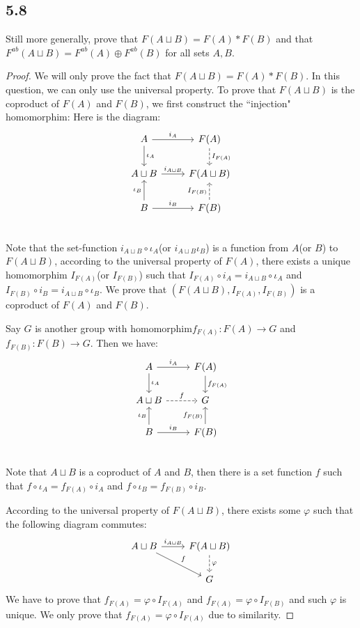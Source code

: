 \documentclass[a4paper, pdf, 12pt]{article}
\begin{document}
\subsection*{5.8}
Still more generally, prove that $F(A\sqcup B) = F(A)*F(B)$ and that $F^{ab}(A\sqcup B) =
F^{ab}(A) \oplus F^{ab}(B)$ for all sets $A, B$. 
\begin{proof}
  We will only prove the fact that $F(A\sqcup B) = F(A) * F(B)$. In this question, we can only use the universal property.
  To prove that $F(A\sqcup B)$ is the coproduct of $F(A)$ and $F(B)$, we first construct the ``injection" homomorphim:
  Here is the diagram:
  $$
  \begin{tikzcd}
    A \ar[r, "i_{A}"] \ar[d, "\iota_{A}"] & F(A) \ar[d, dashed, "I_{F(A)}"]\\
    A\sqcup B \ar[r, "i_{A\sqcup B}"] & F(A\sqcup B) \\
    B \ar[r, "i_{B}"] \ar[u, "\iota_{B}"] & F(B) \ar[u, dashed, "I_{F(B)}"]\\
  \end{tikzcd}
  $$
  Note that the set-function $i_{A\sqcup B}\circ\iota_{A}$(or $i_{A\sqcup B}\iota_{B}$) is a function from $A$(or $B$) to $F(A\sqcup B)$, 
  according to the universal property of $F(A)$, there exists a unique homomorphim $I_{F(A)}$(or $I_{F(B)}$) such that 
  $I_{F(A)}\circ i_{A} = i_{A\sqcup B}\circ \iota_{A}$ and $I_{F(B)}\circ i_{B} = i_{A\sqcup B}\circ \iota_{B}$. We prove that 
  $(F(A\sqcup B), I_{F(A)}, I_{F(B)})$ is a coproduct of $F(A)$ and $F(B)$.

  Say $G$ is another group with homomorphim$f_{F(A)}: F(A)\rightarrow G$ and $f_{F(B)}: F(B)\rightarrow G$. Then we have:
  $$
  \begin{tikzcd}
    A \ar[r, "i_{A}"] \ar[d, "\iota_{A}"] & F(A) \ar[d, "f_{F(A)}"]\\
    A\sqcup B \ar[r, dashed, "f"] & G \\
    B \ar[r, "i_{B}"] \ar[u, "\iota_{B}"] & F(B) \ar[u, "f_{F(B)}"]\\
  \end{tikzcd}
  $$
  Note that $A\sqcup B$ is a coproduct of $A$ and $B$, then there is a set function $f$ such that $f\circ \iota_{A} = f_{F(A)}\circ i_{A}$ and 
  $f\circ \iota_{B} = f_{F(B)}\circ i_{B}$.

  According to the universal property of $F(A\sqcup B)$, there exists some $\varphi$ such that the following diagram commutes:
  $$
  \begin{tikzcd}
    A\sqcup B \ar[r, "i_{A\sqcup B}"] \ar[rd, "f"] & F(A\sqcup B) \ar[d, dashed, "\varphi"]\\
    & G
  \end{tikzcd}
  $$
  We have to prove that $f_{F(A)} = \varphi \circ I_{F(A)}$ and $f_{F(A)} = \varphi \circ I_{F(B)}$ and such $\varphi$ is unique.
  We only prove that $f_{F(A)} = \varphi \circ I_{F(A)}$ due to similarity.


\end{proof}
\end{document}
